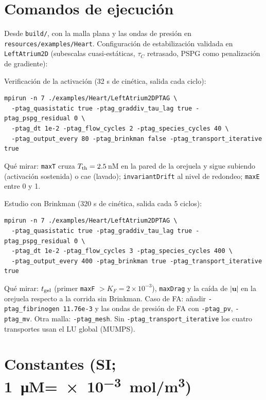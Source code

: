 \documentclass[11pt,a4paper]{article}
\newcommand{\bu}{\bm{u}}
\begin{document}
\section{Comandos de ejecución}

Desde \texttt{build/}, con la malla plana y las ondas de presión en \texttt{resources/examples/Heart}. Configuración de estabilización validada en \texttt{LeftAtrium2D} (subescalas cuasi-estáticas, $\tau_C$ retrasado, PSPG como penalización de gradiente):

\medskip\noindent Verificación de la activación (32 s de cinética, salida cada ciclo):
\begin{verbatim}
mpirun -n 7 ./examples/Heart/LeftAtrium2DPTAG \
  -ptag_quasistatic true -ptag_graddiv_tau_lag true -ptag_pspg_residual 0 \
  -ptag_dt 1e-2 -ptag_flow_cycles 2 -ptag_species_cycles 40 \
  -ptag_output_every 80 -ptag_brinkman false -ptag_transport_iterative true
\end{verbatim}
Qué mirar: \texttt{maxT} cruza $T_{\rm th}=2.5\,$nM en la pared de la orejuela y sigue subiendo (activación sostenida) o cae (lavado); \texttt{invariantDrift} al nivel de redondeo; \texttt{maxE} entre 0 y 1.

\medskip\noindent Estudio con Brinkman (320 s de cinética, salida cada 5 ciclos):
\begin{verbatim}
mpirun -n 7 ./examples/Heart/LeftAtrium2DPTAG \
  -ptag_quasistatic true -ptag_graddiv_tau_lag true -ptag_pspg_residual 0 \
  -ptag_dt 1e-2 -ptag_flow_cycles 3 -ptag_species_cycles 400 \
  -ptag_output_every 400 -ptag_brinkman true -ptag_transport_iterative true
\end{verbatim}
Qué mirar: $t_{\rm gel}$ (primer \texttt{maxF} $>K_F=2\times10^{-3}$), \texttt{maxDrag} y la caída de $|\bu|$ en la orejuela respecto a la corrida sin Brinkman. Caso de FA: añadir \texttt{-ptag\_fibrinogen 11.76e-3} y las ondas de presión de FA con \texttt{-ptag\_pv}, \texttt{-ptag\_mv}. Otra malla: \texttt{-ptag\_mesh}. Sin \texttt{-ptag\_transport\_iterative} los cuatro transportes usan el LU global (MUMPS).

\section{Constantes (SI; \SI{1}{\micro M}=\SI{e-3}{mol/m^3})}
\end{document}
